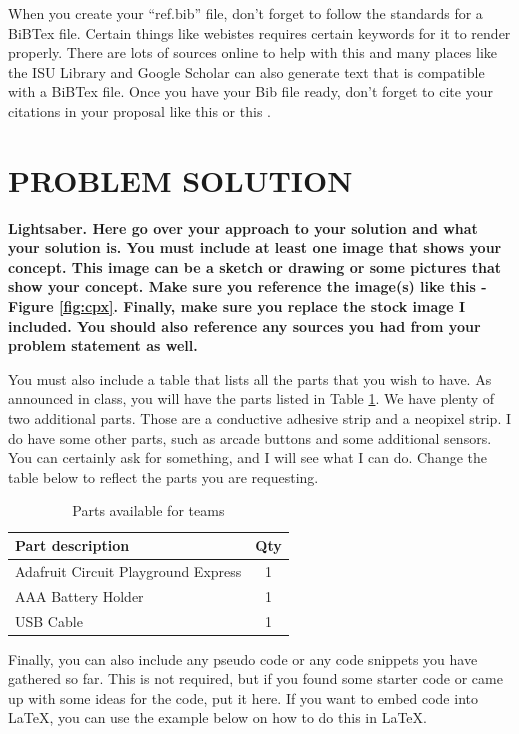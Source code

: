 \documentclass[12pt]{article}
\begin{document}
When you create your ``ref.bib'' file, don't forget to follow the standards for a BiBTex file. Certain things like webistes requires certain keywords for it to render properly. There are lots of sources online to help with this and many places like the ISU Library and Google Scholar can also generate text that is compatible with a BiBTex file. Once you have your Bib file ready, don't forget to cite your citations in your proposal like this \cite{einstein} or this \cite{dirac}.

\section{PROBLEM SOLUTION}

\bf{Lightsaber}. 
Here go over your approach to your solution and what your solution is. You must include at least one image that shows your concept. This image can be a sketch or drawing or some pictures that show your concept. Make sure you reference the image(s) like this - Figure \ref{fig:cpx}. Finally, make sure you replace the stock image I included. You should also reference any sources you had from your problem statement as well.

You must also include a table that lists all the parts that you wish to have. As announced in class, you will have the parts listed in Table \ref{table:parts_list}. We have plenty of two additional parts. Those are a conductive adhesive strip and a neopixel strip. I do have some other parts, such as arcade buttons and some additional sensors. You can certainly ask for something, and I will see what I can do. Change the table below to reflect the parts you are requesting.

\begin{table}[ht]
  \caption{Parts available for teams}
  \label{table:parts_list}
  \begin{center}
  \begin{tabular}{|p{3in}|c|}
  
  \hline
  Part description & Qty\\
  \hline
  \hline
  Adafruit Circuit Playground Express & 1 \\
  \hline
  AAA Battery Holder & 1 \\
  \hline
  USB Cable & 1 \\
  \hline
  \end{tabular}
  \end{center}
  \end{table}

Finally, you can also include any pseudo code or any code snippets you have gathered so far.  This is not required, but if you found some starter code or came up with some ideas for the code, put it here. If you want to embed code into \LaTeX, you can use the example below on how to do this in \LaTeX.
\end{document}
